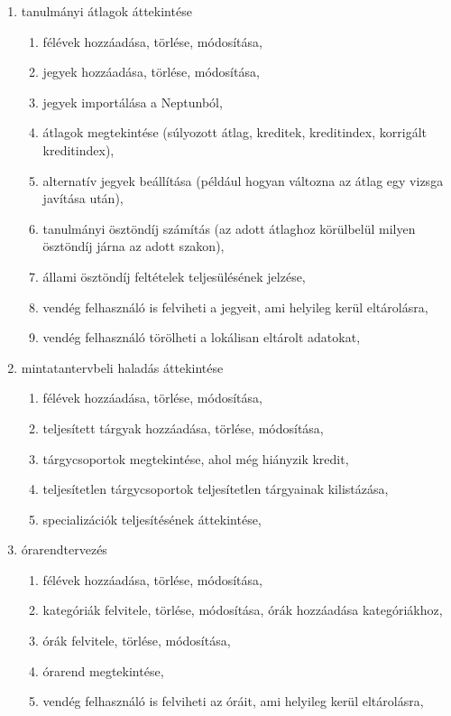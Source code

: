 \documentclass[a4paper,12pt]{report}
\begin{document}
\begin{enumerate}
    \item tanulmányi átlagok áttekintése
    \begin{enumerate}
        \item félévek hozzáadása, törlése, módosítása,
        \item jegyek hozzáadása, törlése, módosítása,
        \item jegyek importálása a Neptunból,
        \item átlagok megtekintése (súlyozott átlag, kreditek, kreditindex, korrigált kreditindex),
        \item alternatív jegyek beállítása (például hogyan változna az átlag egy vizsga javítása után),
        \item tanulmányi ösztöndíj számítás (az adott átlaghoz körülbelül milyen ösztöndíj járna az adott szakon),
        \item állami ösztöndíj feltételek teljesülésének jelzése,
        \item vendég felhasználó is felviheti a jegyeit, ami helyileg kerül eltárolásra,
        \item vendég felhasználó törölheti a lokálisan eltárolt adatokat,
    \end{enumerate}
    \item mintatantervbeli haladás áttekintése
    \begin{enumerate}
        \item félévek hozzáadása, törlése, módosítása,
        \item teljesített tárgyak hozzáadása, törlése, módosítása,
        \item tárgycsoportok megtekintése, ahol még hiányzik kredit,
        \item teljesítetlen tárgycsoportok teljesítetlen tárgyainak kilistázása,
        \item specializációk teljesítésének áttekintése,
    \end{enumerate}
    \item órarendtervezés
    \begin{enumerate}
        \item félévek hozzáadása, törlése, módosítása,
        \item kategóriák felvitele, törlése, módosítása, órák hozzáadása kategóriákhoz,
        \item órák felvitele, törlése, módosítása,
        \item órarend megtekintése,
        \item vendég felhasználó is felviheti az óráit, ami helyileg kerül eltárolásra,

\end{enumerate}
\end{enumerate}
\end{document}
